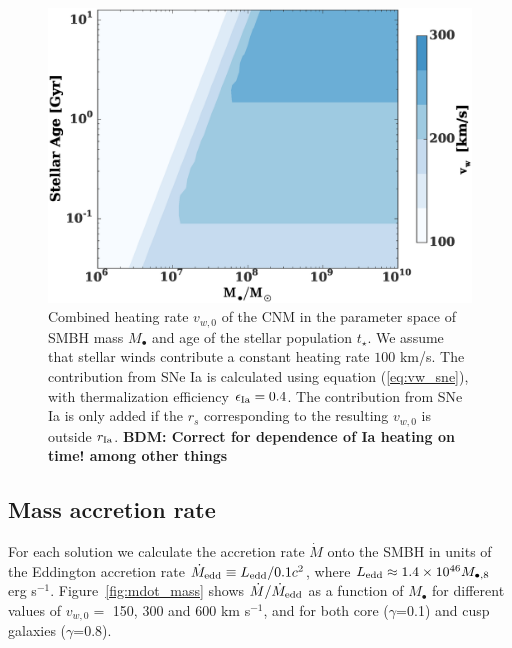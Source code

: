 \documentclass[usenatbib,fleqn]{mn2e}
\newcommand{\Mbh}[1][]{M_{\bullet#1}}
\newcommand{\rIa}{r_{\rm Ia}}
\newcommand{\vwO}{v_{w,0}}
\begin{document}
  \begin{figure}
    \includegraphics[width=\columnwidth]{vw-contour.eps}
    \caption{\label{fig:vweff} Combined heating rate $\vwO$ of the CNM
      in the parameter space of SMBH mass $\Mbh$ and age of the
      stellar population $t_{\star}$.  We assume that stellar winds
      contribute a constant heating rate $100$ km/s. The contribution
      from SNe Ia is calculated using equation (\ref{eq:vw_sne}), with
      thermalization efficiency $\epsilon_{\rm Ia}=0.4$. The
      contribution from SNe Ia is only added if the $r_s$
      corresponding to the resulting $\vwO$ is outside
      $\rIa$.  {\bf BDM: Correct for dependence of Ia heating on time! among other things}}%
  \end{figure}


\subsection{Mass accretion rate}

For each solution we calculate the accretion rate $\dot{M}$ onto the
SMBH in units of the Eddington accretion rate $\dot{M}_{\rm edd}
\equiv L_{\rm edd}/0.1 c^{2}$, where $L_{\rm edd} \approx 1.4\times
10^{46}M_{\bullet,8}$ erg s$^{-1}$.  Figure~\ref{fig:mdot_mass} shows
$\dot{M}/\dot{M}_{\rm edd}$ as a function of $\Mbh$ for different
values of $\vwO =$ 150, 300 and 600 km s$^{-1}$, and for both core
($\gamma$=0.1) and cusp galaxies ($\gamma$=0.8). 
\end{document}
